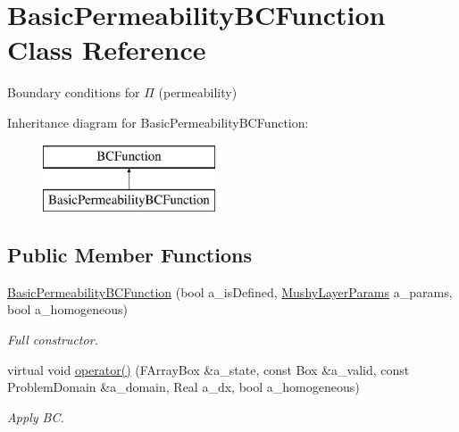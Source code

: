 \hypertarget{class_basic_permeability_b_c_function}{\section{Basic\-Permeability\-B\-C\-Function Class Reference}
\label{class_basic_permeability_b_c_function}
}


Boundary conditions for $\Pi$ (permeability)  


Inheritance diagram for Basic\-Permeability\-B\-C\-Function\-:\begin{figure}[H]
\begin{center}
\leavevmode
\includegraphics[height=2.000000cm]{class_basic_permeability_b_c_function}
\end{center}
\end{figure}
\subsection*{Public Member Functions}
\begin{DoxyCompactItemize}
\item 
\hypertarget{class_basic_permeability_b_c_function_a1e4bbb4ab032679a09a621e646038149}{\hyperlink{class_basic_permeability_b_c_function_a1e4bbb4ab032679a09a621e646038149}{Basic\-Permeability\-B\-C\-Function} (bool a\-\_\-is\-Defined, \hyperlink{class_mushy_layer_params}{Mushy\-Layer\-Params} a\-\_\-params, bool a\-\_\-homogeneous)}\label{class_basic_permeability_b_c_function_a1e4bbb4ab032679a09a621e646038149}

\begin{DoxyCompactList}\small\item\em Full constructor. \end{DoxyCompactList}\item 
\hypertarget{class_basic_permeability_b_c_function_a1831a00dcb341d6bb87d497eb43c3d7a}{virtual void \hyperlink{class_basic_permeability_b_c_function_a1831a00dcb341d6bb87d497eb43c3d7a}{operator()} (F\-Array\-Box \&a\-\_\-state, const Box \&a\-\_\-valid, const Problem\-Domain \&a\-\_\-domain, Real a\-\_\-dx, bool a\-\_\-homogeneous)}\label{class_basic_permeability_b_c_function_a1831a00dcb341d6bb87d497eb43c3d7a}

\begin{DoxyCompactList}\small\item\em Apply B\-C. \end{DoxyCompactList}\end{DoxyCompactItemize}

